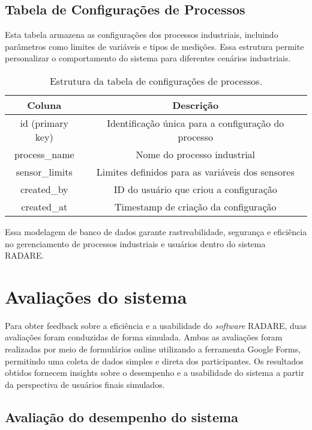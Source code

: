 \subsection{Tabela de Configurações de Processos}

Esta tabela armazena as configurações dos processos industriais, incluindo parâmetros como limites de variáveis e tipos de medições. Essa estrutura permite personalizar o comportamento do sistema para diferentes cenários industriais.

\begin{table}[htbp]
    \centering
    \caption{Estrutura da tabela de configurações de processos.}
    \label{Tab:ProcessConfigurations}
    \begin{tabular}{|c|c|}
        \hline
        \textbf{Coluna} & \textbf{Descrição} \\ \hline
        id (primary key) & Identificação única para a configuração do processo \\ \hline
        process\_name & Nome do processo industrial \\ \hline
        sensor\_limits & Limites definidos para as variáveis dos sensores \\ \hline
        created\_by & ID do usuário que criou a configuração \\ \hline
        created\_at & Timestamp de criação da configuração \\ \hline
    \end{tabular}
\end{table}

Essa modelagem de banco de dados garante rastreabilidade, segurança e eficiência no gerenciamento de processos industriais e usuários dentro do sistema RADARE.



\section{Avaliações do sistema}

Para obter feedback sobre a eficiência e a usabilidade do \textit{software} RADARE, duas avaliações foram conduzidas de forma simulada. Ambas as avaliações foram realizadas por meio de formulários online utilizando a ferramenta Google Forms, permitindo uma coleta de dados simples e direta dos participantes. Os resultados obtidos fornecem insights sobre o desempenho e a usabilidade do sistema a partir da perspectiva de usuários finais simulados.

\subsection{Avaliação do desempenho do sistema}

